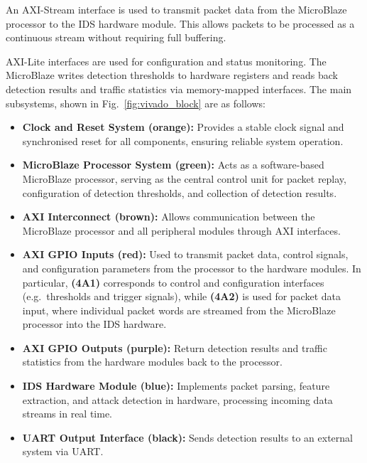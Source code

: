An AXI-Stream interface is used to transmit packet data from the MicroBlaze
processor to the IDS hardware module. This allows packets to be processed as a
continuous stream without requiring full buffering.

AXI-Lite interfaces are used for configuration and status monitoring. The
MicroBlaze writes detection thresholds to hardware registers and reads back
detection results and traffic statistics via memory-mapped interfaces.
The main subsystems, shown in Fig.~\ref{fig:vivado_block} are as follows:
\begin{itemize}
    \item[\textbf{(1)}] \textbf{Clock and Reset System (orange):}
          Provides a stable clock signal and synchronised reset for all components,
          ensuring reliable system operation.

    \item[\textbf{(2)}] \textbf{MicroBlaze Processor System (green):}
          Acts as a software-based MicroBlaze processor, serving as the central control
          unit for packet replay, configuration of detection thresholds, and collection
          of detection results.

    \item[\textbf{(3)}] \textbf{AXI Interconnect (brown):}
          Allows communication between the MicroBlaze processor and all peripheral
          modules through AXI interfaces.

    \item[\textbf{(4A)}] \textbf{AXI GPIO Inputs (red):}
          Used to transmit packet data, control signals, and configuration parameters
          from the processor to the hardware modules. In particular, \textbf{(4A1)}
          corresponds to control and configuration interfaces (e.g.\ thresholds and
          trigger signals), while \textbf{(4A2)} is used for packet data input, where
          individual packet words are streamed from the MicroBlaze processor into the
          IDS hardware.

    \item[\textbf{(4B)}] \textbf{AXI GPIO Outputs (purple):}
          Return detection results and traffic statistics from the hardware modules back
          to the processor.

    \item[\textbf{(5)}] \textbf{IDS Hardware Module (blue):}
          Implements packet parsing, feature extraction, and attack detection in hardware,
          processing incoming data streams in real time.

    \item[\textbf{(6)}] \textbf{UART Output Interface (black):}
          Sends detection results to an external system via UART.
\end{itemize}



